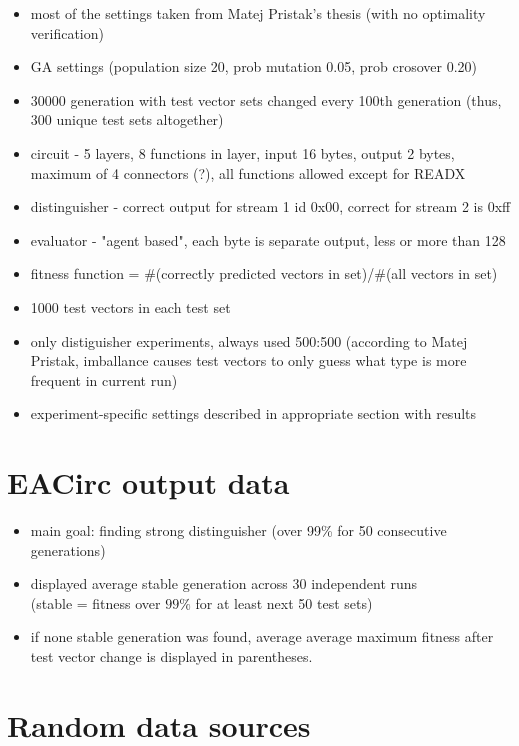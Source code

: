 \documentclass[12pt,oneside]{fithesis2}
\begin{document}
\begin{itemize}
\item most of the settings taken from Matej Pristak's thesis (with no optimality verification)
\item GA settings (population size 20, prob mutation 0.05, prob crosover 0.20)
\item 30000 generation with test vector sets changed every 100th generation (thus, 300 unique test sets altogether)
\item circuit - 5 layers, 8 functions in layer, input 16 bytes, output 2 bytes, maximum of 4 connectors (?), all functions allowed except for READX
\item distinguisher - correct output for stream 1 id 0x00, correct for stream 2 is 0xff
\item evaluator - "agent based", each byte is separate output, less or more than 128
\item fitness function = \#(correctly predicted vectors in set)/\#(all vectors in set)
\item 1000 test vectors in each test set
\item only distiguisher experiments, always used 500:500 (according to Matej Pristak, imballance causes test vectors to only guess what type is more frequent in current run)
\item experiment-specific settings described in appropriate section with results
\end{itemize}

\section{EACirc output data}
\label{sec:settings-eacirc-output}

\begin{itemize}
\item main goal: finding strong distinguisher (over 99\% for 50 consecutive generations)
\item displayed average stable generation across 30 independent runs \\
(stable = fitness over $99\%$ for at least next 50 test sets)
\item if none stable generation was found, average average maximum fitness after test vector change is displayed in parentheses.
\end{itemize}

\section{Random data sources}
\label{sec:settings-random}
\end{document}
